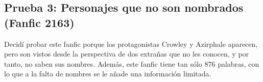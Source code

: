 \documentclass{pre-tfg}
\newcommand{\finalProgramName}{fic\_character\_extractor }
\begin{document}
\begin{comment}
\begin{table}
	\resizebox{\textwidth}{!}{%
		\begin{tabular}{lllllll}
			Canon ID & Name            & MALE & FEMALE & NEUTRAL & UNKNOWN & Other names       \\
			NO       & Lord Beezlebub  & 2    &       &         &          &  \\
			NO       & Lilith          & 1    &      &         &     &      \\
			14       & Did Gabriel     & 1     &      &         &     &      \\
			NO       & Ashmedai        & 11     &      &         &     &       \\
			4       & Aziraphale        & 42     &      &         &     &   \\
			NO       & Laradiri        & 16    &      &         &     &       \\
			NO       & Every Woman        & 1    &      &         &     &       \\
			NO       & Marut        & 1    &      &         &     &       \\
			NO       & Joe        & 1    &      &         &     &       \\
			NO       & Amides        & 1    &      &         &     &       \\
			NO       & Mr Dudders        & 1    &      &         &     &       \\
			NO       & History       & 1    &      &         &     &       \\
			14       & Gabriel        & 1     &      &         &     &       \\
			NO       & Butter        & 1     &      &         &     &       \\
			NO       & Alisha        & 1     &      &         &     &       \\
			4       & Aziraphale never        & 1    &      &         &     &       \\
			NO       & Mrs Beeton        & 1     &      &         &     &       \\
		\end{tabular}%
	}
	\caption{Resultados de la ejecución de \finalProgramName para analizar fanfic 9}
	\label{table:eval3_nercorenlp}
\end{table}

\end{comment}

\subsection{Prueba 3: Personajes que no son nombrados (Fanfic 2163)}
Decidí probar este fanfic porque los protagonistas Crowley y Azirphale aparecen, pero son vistos desde la perspectiva de dos extrañas que no les conocen, y por tanto, no saben sus nombres. Además, este fanfic tiene tan sólo 876 palabras, con lo que a la falta de nombres se le añade una información limitada.
\end{document}
